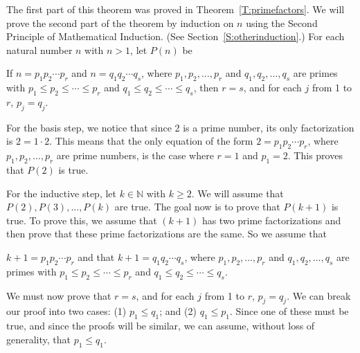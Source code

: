 %
\begin{myproof}
The first part of this theorem was proved in Theorem~\ref{T:primefactors}.  We will prove the second part of the theorem by induction on  $n$  using the Second Principle of Mathematical Induction.  (See Section~\ref{S:otherinduction}.)  For each natural number  $n$  with  $n > 1$,  let  $P( n )$ be

\begin{list}{}
\item If  $n = p_1 p_2  \cdots p_r$ and $n = q_1 q_2  \cdots q_s $, where  
$p_1 , p_2 ,  \ldots, p_r $ and  
$q_1 , q_2 ,  \ldots, q_s $ are primes with  
$p_1  \leq p_2  \leq  \cdots  \leq p_r $  and  
$q_1  \leq q_2  \leq  \cdots  \leq q_s $, then  $r = s$, and for each  $j$  from  1  to  $r$,  $p_j  = q_j $.
\end{list}

For the basis step, we notice that since  2  is a  prime number, its only factorization is  
$2 = 1 \cdot 2$.  This means that the only equation of the form  $2 = p_1 p_2  \cdots p_r $, where  $p_1 , p_2 ,  \ldots, p_r $ are prime numbers, is the case where  $r = 1$ and  $p_1  = 2$.  This proves that  $P( 2 )$  is true.

For the inductive step, let  $k \in \mathbb{N}$ with  $k \geq 2$.  We will assume that \linebreak
$P( 2 ), P( 3 ),  \ldots , P( k )$ are true.  The goal now is to prove that  $P( {k + 1} )$ is true.  To prove this, we assume that  $(k + 1)$ has two prime factorizations and then prove that these prime factorizations are the same.  So we assume that

\begin{list}{}
\item $k + 1 = p_1 p_2  \cdots p_r$ and that $k + 1 = q_1 q_2  \cdots q_s $, where  
$p_1 , p_2 ,  \ldots, p_r $ and  $q_1 , q_2 ,  \ldots, q_s $ are primes with  
$p_1  \leq p_2  \leq  \cdots  \leq p_r $  and  
$q_1  \leq q_2  \leq  \cdots  \leq q_s $.
\end{list}

\vskip6pt
\noindent
We must now prove that  $r = s$, and for each  $j$  from  1  to  $r$,  $p_j  = q_j $.  We can break our proof into two cases:  (1)  $p_1  \leq q_1 $; and (2) $q_1  \leq p_1 $.  Since one of these must be true, and since the proofs will be similar, we can assume, without loss of generality,  that  $p_1  \leq q_1 $.


\end{myproof}

